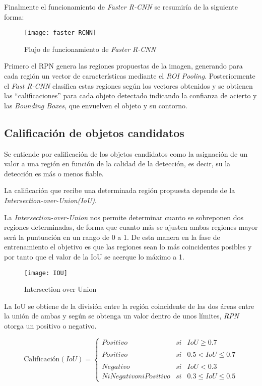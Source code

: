 Finalmente el funcionamiento de \emph{Faster R-CNN} se resumiría de la siguiente forma:

\begin{figure}[htb]
	\centering
	\texttt{[image: faster-RCNN]}
	\caption[Flujo de funcionamiento de \emph{Faster R-CNN}]{Flujo de funcionamiento de \emph{Faster R-CNN} \cite{ren2016faster}}
\end{figure}

Primero el RPN genera las regiones propuestas de la imagen, generando para cada región un vector de características mediante el \emph{ROI Pooling}. Posteriormente el \emph{Fast R-CNN} clasifica estas regiones según los vectores obtenidos y se obtienen las ``calificaciones'' para cada objeto detectado indicando la confianza de acierto y las \emph{Bounding Boxes}, que envuelven el objeto y su contorno.

\subsection{Calificación de objetos candidatos}
Se entiende por calificación de los objetos candidatos como la asignación de un valor a una región en función de la calidad de la detección, es decir, su la detección es más o menos fiable.

La calificación que recibe una determinada región propuesta depende de la \emph{Intersection-over-Union(IoU)}.

La \emph{Intersection-over-Union} nos permite determinar cuanto se sobreponen dos regiones determinadas, de forma que cuanto más se ajusten ambas regiones mayor será la puntuación en un rango de 0 a 1. De esta manera en la fase de entrenamiento el objetivo es que las regiones sean lo más coincidentes posibles y por tanto que el valor de la IoU se acerque lo máximo a 1.

\begin{figure}[htb]
	\centering
	\texttt{[image: IOU]}
	\caption[Intersection over Union]{Intersection over Union 
	\cite{metrics:iou}}
\end{figure}

La IoU se obtiene de la división entre la región coincidente de las dos áreas entre la unión de ambas y según se obtenga un valor dentro de unos límites, \emph{RPN} otorga un positivo o negativo.

$$
\text{Calificación}(IoU)= \left\{ \begin{array}{lcc}
             Positivo &   si  & IoU \geq 0.7 \\
             \\ Positivo &  si & 0.5 < IoU \leq 0.7 \\
             \\ Negativo &  si  & IoU < 0.3
             \\ Ni Negativo ni Positivo &  si  & 0.3 \leq IoU \leq 0.5
             \end{array}
   \right.
$$

